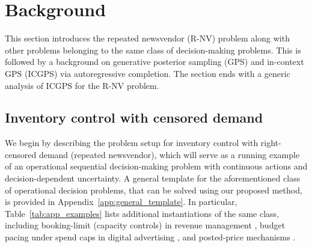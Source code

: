 \documentclass[11pt]{article}
\begin{document}
\section{Background}
\label{sec:framework}

This section introduces the repeated newsvendor (R-NV) problem along with other problems belonging to the same class of decision-making problems. This is followed by a background on generative posterior sampling (GPS) and in-context GPS (ICGPS) via autoregressive completion. The section ends with a generic analysis of ICGPS for the R-NV problem.


















\subsection{Inventory control with censored demand}
\label{sec:nv_running_example}

We begin by describing the problem setup for inventory control with right-censored demand (repeated newsvendor), which will serve as a running example of an operational sequential decision-making problem with continuous actions and decision-dependent uncertainty. A general template for the aforementioned class of operational decision problems, that can be solved using our proposed method, is provided in Appendix~\ref{app:general_template}. In particular, Table~\ref{tab:app_examples} lists additional instantiations of the same class, including booking-limit (capacity controls) in revenue management \cite{TalluriVanRyzin2004,littlewood2005forecasting}, budget pacing under spend caps in digital advertising \cite{BalseiroEtAl2023RobustPacing,ConitzerEtAl2022PacingEq}, and posted-price mechanisms \cite{KleinbergLeighton2003,Myerson1981}.
\end{document}
